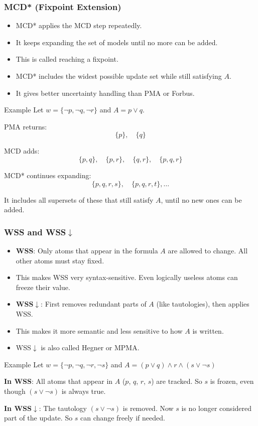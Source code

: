 \documentclass{beamer}
\begin{document}
\begin{frame}
\frametitle{MCD* (Fixpoint Extension)}
\small
\begin{itemize}
    \item MCD* applies the MCD step repeatedly.
    \item It keeps expanding the set of models until no more can be added.
    \item This is called reaching a fixpoint.
    \item MCD* includes the widest possible update set while still satisfying $A$.
    \item It gives better uncertainty handling than PMA or Forbus.
\end{itemize}
\pause
\small
\begin{block}{Example}
Let $w = \{\neg p, \neg q, \neg r\}$ and $A = p \lor q$.

PMA returns:
\[
\{p\}, \quad \{q\}
\]

MCD adds:
\[
\{p, q\}, \quad \{p, r\}, \quad \{q, r\}, \quad \{p, q, r\}
\]

MCD* continues expanding:
\[
\{p, q, r, s\}, \quad \{p, q, r, t\}, \ldots
\]

It includes all supersets of these that still satisfy $A$, until no new ones can be added.
\end{block}
\end{frame}

\begin{frame}
\frametitle{WSS and WSS$\downarrow$}
\small
\begin{itemize}
    \item \textbf{WSS}: Only atoms that appear in the formula $A$ are allowed to change. All other atoms must stay fixed.
    \item This makes WSS very syntax-sensitive. Even logically useless atoms can freeze their value.
    \item \textbf{WSS$\downarrow$}: First removes redundant parts of $A$ (like tautologies), then applies WSS.
    \item This makes it more semantic and less sensitive to how $A$ is written.
    \item WSS$\downarrow$ is also called Hegner or MPMA.
\end{itemize}
\pause
\small
\begin{block}{Example}
Let $w = \{\neg p, \neg q, \neg r, \neg s\}$ and $A = (p \lor q) \land r \land (s \lor \neg s)$

\textbf{In WSS}:
All atoms that appear in $A$ ($p$, $q$, $r$, $s$) are tracked.
So $s$ is frozen, even though $(s \lor \neg s)$ is always true.

\textbf{In WSS$\downarrow$}:
The tautology $(s \lor \neg s)$ is removed.
Now $s$ is no longer considered part of the update.
So $s$ can change freely if needed.
\end{block}
\end{frame}
\end{document}
